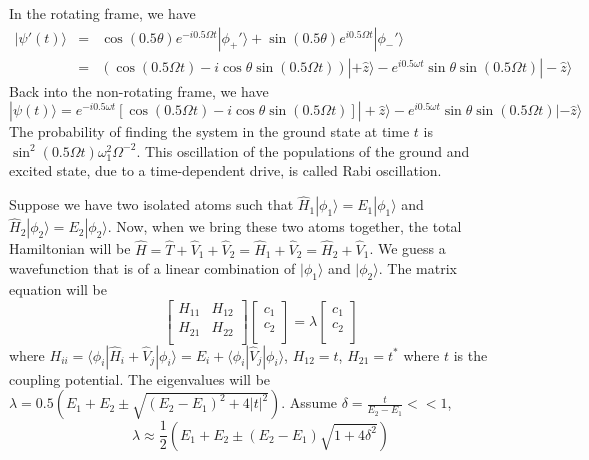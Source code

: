 \documentclass[a4paper]{article}
\begin{document}
\begin{eg}
In the rotating frame, we have
\begin{eqnarray}
|\psi'(t)\rangle&=&\cos(0.5\theta)e^{-i0.5\Omega t}|\phi_+'\rangle+\sin(0.5\theta)e^{i0.5\Omega t}|\phi_-'\rangle\nonumber\\&=&(\cos(0.5\Omega t)-i\cos\theta\sin(0.5\Omega t))|+\hat{z}\rangle-e^{i0.5\omega t}\sin\theta\sin(0.5\Omega t)|-\hat{z}\rangle\nonumber
\end{eqnarray}
Back into the non-rotating frame, we have
$$|\psi(t)\rangle=e^{-i0.5\omega t}[\cos(0.5\Omega t)-i\cos\theta\sin(0.5\Omega t)]|+\hat{z}\rangle-e^{i0.5\omega t}\sin\theta\sin(0.5\Omega t)|-\hat{z}\rangle$$
The probability of finding the system in the ground state at time $t$ is $\sin^2(0.5\Omega t)\omega_1^2\Omega^{-2}$. This oscillation of the populations of the ground and excited state, due to a time-dependent drive, is called Rabi oscillation.
\end{eg}
\begin{eg}[LCAO]
Suppose we have two isolated atoms such that $\hat{H}_1|\phi_1\rangle=E_1|\phi_1\rangle$ and $\hat{H}_2|\phi_2\rangle=E_2|\phi_2\rangle$. Now, when we bring these two atoms together, the total Hamiltonian will be $\hat{H}=\hat{T}+\hat{V}_1+\hat{V}_2=\hat{H}_1+\hat{V}_2=\hat{H}_2+\hat{V}_1$. We guess a wavefunction that is  of a linear combination of $|\phi_1\rangle$ and $|\phi_2\rangle$. The matrix equation will be
$$\begin{bmatrix}H_{11}&H_{12}\\H_{21}&H_{22}\\\end{bmatrix}\begin{bmatrix}c_1\\c_2\\\end{bmatrix}=\lambda\begin{bmatrix}c_1\\c_2\\\end{bmatrix}$$
where $H_{ii}=\langle\phi_i|\hat{H}_i+\hat{V}_j|\phi_i\rangle=E_i+\langle\phi_i|\hat{V}_j|\phi_i\rangle$, $H_{12}=t$, $H_{21}=t^*$ where $t$ is the coupling potential. The eigenvalues will be $\lambda=0.5(E_1+E_2\pm\sqrt{(E_2-E_1)^2+4|t|^2})$. Assume $\delta=\frac{t}{E_2-E_1}<<1$,
$$\lambda\approx\frac{1}{2}(E_1+E_2\pm(E_2-E_1)\sqrt{1+4\delta^2})$$
\end{eg}
\end{document}
